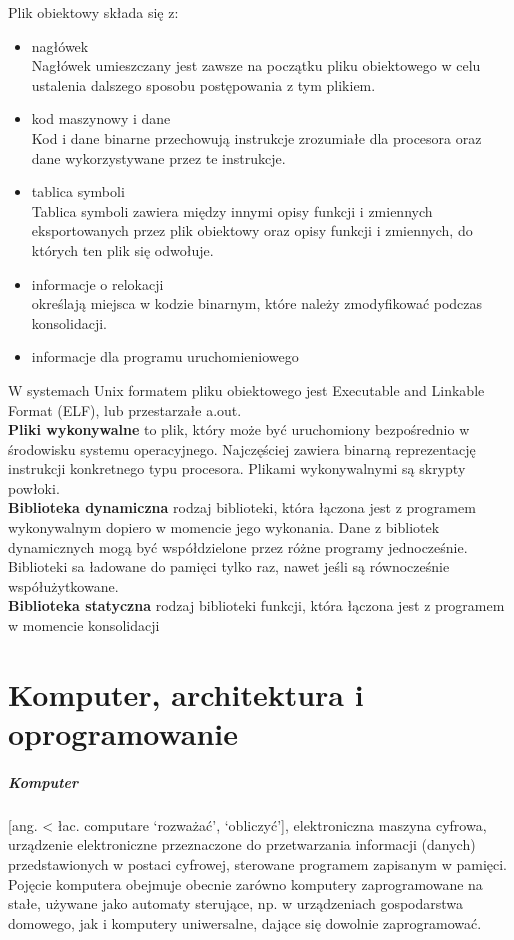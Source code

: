 \documentclass[a4paper,twoside]{report}
\begin{document}
Plik obiektowy składa się z:
\begin{itemize}
	\item nagłówek\\
	Nagłówek umieszczany jest zawsze na początku pliku obiektowego w celu ustalenia dalszego sposobu postępowania z tym plikiem. 
	\item kod maszynowy i dane\\
	Kod i dane binarne przechowują instrukcje zrozumiałe dla procesora oraz dane wykorzystywane przez te instrukcje.
	\item tablica symboli\\
	Tablica symboli zawiera między innymi opisy funkcji i zmiennych eksportowanych przez plik obiektowy oraz opisy funkcji i zmiennych, do których ten plik się odwołuje.
	\item informacje o relokacji\\
	określają miejsca w kodzie binarnym, które należy zmodyfikować podczas konsolidacji. 
	\item informacje dla programu uruchomieniowego
\end{itemize}

W systemach Unix formatem pliku obiektowego jest Executable and Linkable Format (ELF), lub przestarzałe a.out. \\


\textbf{Pliki wykonywalne}  to plik, który może być uruchomiony bezpośrednio w środowisku systemu operacyjnego. Najczęściej zawiera binarną reprezentację instrukcji konkretnego typu procesora. Plikami wykonywalnymi są skrypty powłoki. \\

\textbf{Biblioteka dynamiczna}  rodzaj biblioteki, która łączona jest z programem wykonywalnym dopiero w momencie jego wykonania. Dane z bibliotek dynamicznych mogą być współdzielone przez różne programy jednocześnie. Biblioteki sa ładowane do pamięci tylko raz, nawet jeśli są równocześnie współużytkowane.\\

\textbf{Biblioteka statyczna}  rodzaj biblioteki funkcji, która łączona jest z programem w momencie konsolidacji

\chapter{Komputer, architektura i oprogramowanie}
\paragraph{Komputer} [ang. < łac. computare ‘rozważać’, ‘obliczyć’], elektroniczna maszyna cyfrowa, urządzenie elektroniczne przeznaczone do przetwarzania informacji (danych) przedstawionych w postaci cyfrowej, sterowane programem zapisanym w pamięci.
Pojęcie komputera obejmuje obecnie zarówno komputery zaprogramowane na stałe, używane jako automaty sterujące, np. w urządzeniach gospodarstwa domowego, jak i komputery uniwersalne, dające się dowolnie zaprogramować.
\end{document}
